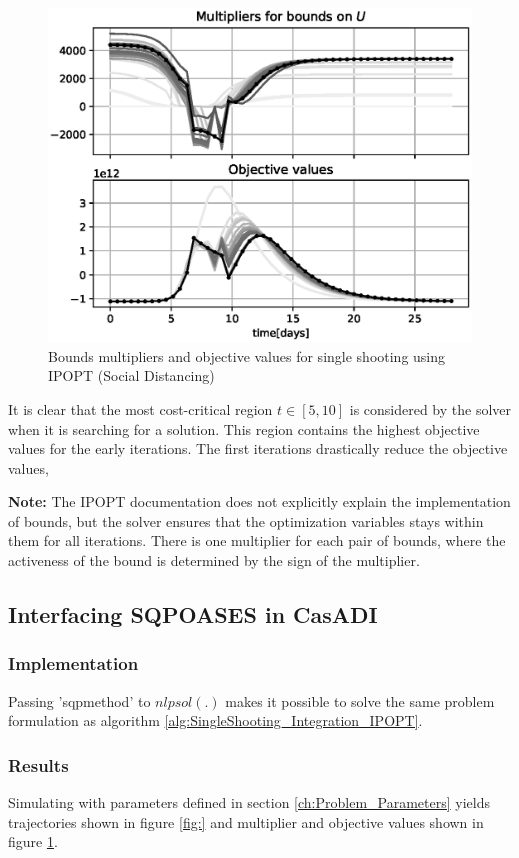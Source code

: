 \begin{figure}[H]
    \centering
    \includegraphics[width=.8\textwidth]{pythonProject/Figures/Single_Shooting_obj_con_IPOPT.eps}
    \caption{Bounds multipliers and objective values for single shooting using IPOPT (Social Distancing)}
    \label{fig:SH_con_obj_IPOPT}
\end{figure}
It is clear that the most cost-critical region $t\in [5, 10]$ is considered by the solver when it is searching for a solution. This region contains the highest objective values for the early iterations. The first iterations drastically reduce the objective values, 

\textbf{Note:} The IPOPT documentation does not explicitly explain the implementation of bounds, but the solver ensures that the optimization variables stays within them for all iterations. There is one multiplier for each pair of bounds, where the activeness of the bound is determined by the sign of the multiplier.

\subsection{Interfacing SQPOASES in CasADI}
\subsubsection{Implementation}
Passing 'sqpmethod' to $nlpsol(.)$ makes it possible to solve the same problem formulation as algorithm \ref{alg:SingleShooting_Integration_IPOPT}.

\subsubsection{Results}
Simulating with parameters defined in section \ref{ch:Problem_Parameters} yields trajectories shown in figure \ref{fig:} and multiplier and objective values shown in figure \ref{fig:SH_con_obj_IPOPT}.